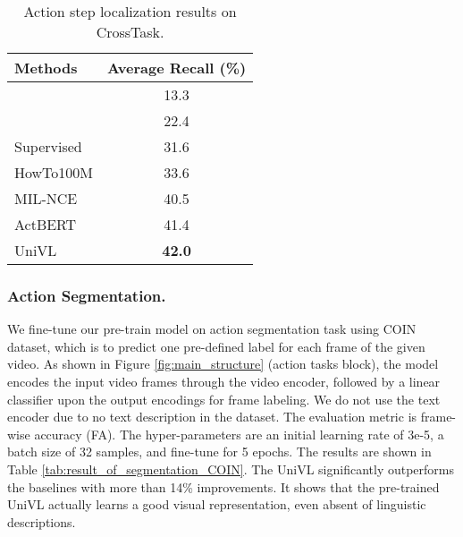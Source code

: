 \documentclass[11pt,a4paper]{article}
\begin{document}
	\begin{table*}[tp] 
		\setlength{\tabcolsep}{4pt}
		\centering
\begin{tabular}{lc}
			\toprule
			Methods         & Average Recall (\%)    \\ \midrule
			\citet{Alayrac2016Unsupervised}   & 13.3 \\  
			\citet{Zhukov2019Cross}   & 22.4 \\  
			Supervised \cite{Zhukov2019Cross}   & 31.6 \\  
			HowTo100M \cite{miech2019howto100m}   & 33.6 \\  
			MIL-NCE \cite{miech19endtoend}   & 40.5 \\  
			ActBERT \cite{Zhu_2020_CVPR}   & 41.4 \\  
			\midrule
			UniVL   & \textbf{42.0 } \\
			\bottomrule
		\end{tabular}
\caption{Action step localization results on CrossTask.}
		\label{tab:result_of_localization_CrossTask}
	\end{table*}
	
	\subsubsection{Action Segmentation.} 
	We fine-tune our pre-train model on action segmentation task using COIN dataset, which is to predict one pre-defined label for each frame of the given video. As shown in Figure \ref{fig:main_structure} (action tasks block), the model encodes the input video frames through the video encoder, followed by a linear classifier upon the output encodings for frame labeling. We do not use the text encoder due to no text description in the dataset. The evaluation metric is frame-wise accuracy (FA). The hyper-parameters are an initial learning rate of 3e-5, a batch size of 32 samples, and fine-tune for 5 epochs. The results are shown in Table \ref{tab:result_of_segmentation_COIN}. The UniVL significantly outperforms the baselines with more than 14\% improvements. It shows that the pre-trained UniVL actually learns a good visual representation, even absent of linguistic descriptions.
	
\end{document}
